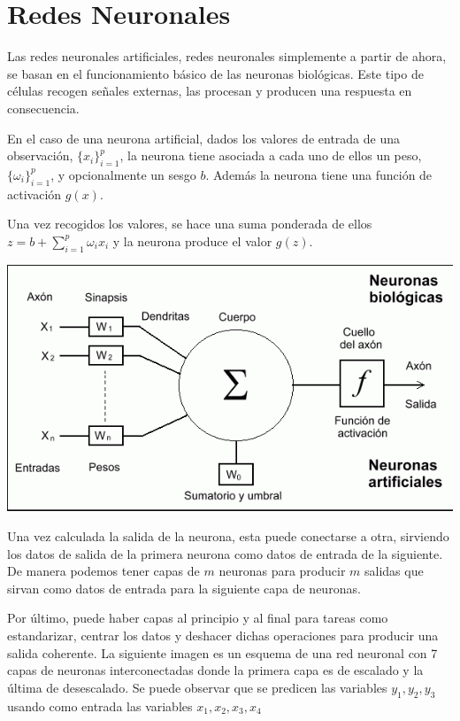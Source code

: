 \section{Redes Neuronales}

\noindent Las redes neuronales artificiales, redes neuronales simplemente a partir de ahora, se basan en el funcionamiento básico de las neuronas biológicas. Este tipo de células recogen señales externas, las procesan y producen una respuesta en consecuencia. 

\noindent En el caso de una neurona artificial, dados los valores de entrada de una observación, $\lbrace x_i\rbrace_{i=1}^p$, la neurona tiene asociada a cada uno de ellos un peso, $\lbrace \omega_i\rbrace_{i=1}^p$, y opcionalmente un sesgo $b$. Además la neurona tiene una función de activación $g(x)$. 

\noindent Una vez recogidos los valores, se hace una suma ponderada de ellos $z=b+\sum_{i=1}^p \omega_i x_i$ y la neurona produce el valor $g(z)$.

\begin{center}
\includegraphics[scale=0.65]{Documentos Extra/neurona.png}
\end{center}

\noindent Una vez calculada la salida de la neurona, esta puede conectarse a otra, sirviendo los datos de salida de la primera neurona como datos de entrada de la siguiente. De manera  podemos tener capas de $m$ neuronas para producir $m$ salidas que sirvan como datos de entrada para la siguiente capa de neuronas.

\noindent Por último, puede haber capas al principio y al final para tareas como estandarizar, centrar los datos y deshacer dichas operaciones para producir una salida coherente. 
\noindent La siguiente imagen es un esquema de una red neuronal con 7 capas de neuronas interconectadas donde la primera capa es de escalado y la última de desescalado. Se puede observar que se predicen las variables $y_1, y_2, y_3$ usando como entrada las variables $x_1,x_2,x_3,x_4$ 

